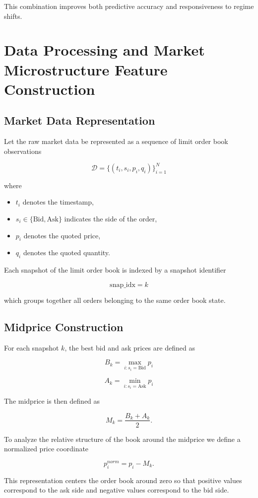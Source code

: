 \documentclass[11pt]{article}
\begin{document}
This combination improves both predictive accuracy and responsiveness
to regime shifts.
\section{Data Processing and Market Microstructure Feature Construction}

\subsection{Market Data Representation}

Let the raw market data be represented as a sequence of limit order book observations

\[
\mathcal{D} = \{(t_i, s_i, p_i, q_i)\}_{i=1}^{N}
\]

where

\begin{itemize}
\item $t_i$ denotes the timestamp,
\item $s_i \in \{\text{Bid},\text{Ask}\}$ indicates the side of the order,
\item $p_i$ denotes the quoted price,
\item $q_i$ denotes the quoted quantity.
\end{itemize}

Each snapshot of the limit order book is indexed by a snapshot identifier

\[
\text{snap\_idx} = k
\]

which groups together all orders belonging to the same order book state.

\subsection{Midprice Construction}

For each snapshot $k$, the best bid and ask prices are defined as

\[
B_k = \max_{i:s_i=\text{Bid}} p_i
\]

\[
A_k = \min_{i:s_i=\text{Ask}} p_i
\]

The midprice is then defined as

\[
M_k = \frac{B_k + A_k}{2}.
\]

To analyze the relative structure of the book around the midprice we define a normalized price coordinate

\[
p_i^{norm} = p_i - M_k.
\]

This representation centers the order book around zero so that positive values correspond to the ask side and negative values correspond to the bid side.
\end{document}
